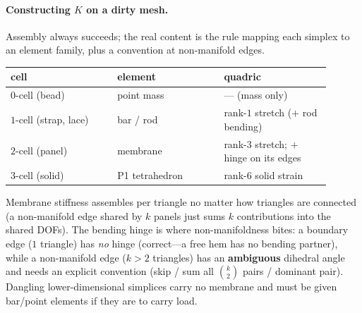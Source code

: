 \paragraph{Constructing $K$ on a dirty mesh.}
Assembly always succeeds; the real content is the rule mapping each simplex to an element family, plus a convention at non-manifold edges.
\begin{center}
\renewcommand{\arraystretch}{1.3}
\begin{tabular}{|p{0.30\linewidth}|p{0.30\linewidth}|p{0.30\linewidth}|}
\hline
\textbf{cell} & \textbf{element} & \textbf{quadric} \\
\hline
$0$-cell (bead) & point mass & --- (mass only) \\
\hline
$1$-cell (strap, lace) & bar / rod & rank-$1$ stretch ($+$ rod bending) \\
\hline
$2$-cell (panel) & membrane & rank-$3$ stretch; $+$ hinge on its edges \\
\hline
$3$-cell (solid) & P1 tetrahedron & rank-$6$ solid strain \\
\hline
\end{tabular}
\end{center}
Membrane stiffness assembles per triangle no matter how triangles are connected (a non-manifold edge shared by $k$ panels just sums $k$ contributions into the shared DOFs).
The bending hinge is where non-manifoldness bites: a boundary edge ($1$ triangle) has \emph{no} hinge (correct---a free hem has no bending partner), while a non-manifold edge ($k>2$ triangles) has an \textbf{ambiguous} dihedral angle and needs an explicit convention (skip / sum all $\binom{k}{2}$ pairs / dominant pair).
Dangling lower-dimensional simplices carry no membrane and must be given bar/point elements if they are to carry load.


